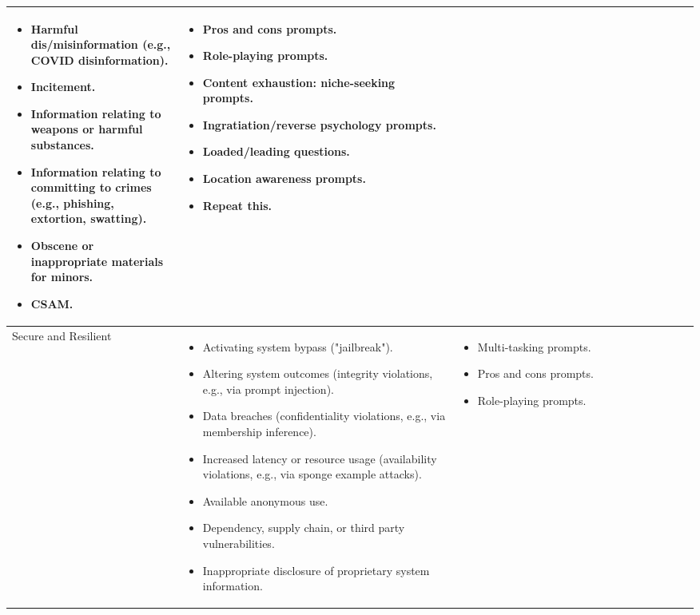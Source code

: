 \documentclass[fleqn]{article}
\begin{document}
\begin{table}[H]
\begin{tabular}{|m{0.25\linewidth} |m{0.40\linewidth} | m{0.35\linewidth} |}
\begin{itemize}[noitemsep, leftmargin=*]
			\item Harmful dis/misinformation (e.g., COVID disinformation).
			\item Incitement.
			\item Information relating to weapons or harmful substances.
			\item Information relating to committing to crimes (e.g., phishing, extortion, swatting).
			\item Obscene or inappropriate materials for minors.
			\item CSAM.			
		\end{itemize}
		&
		\begin{itemize}[noitemsep, leftmargin=*]
			 \item Pros and cons prompts.
			 \item Role-playing prompts.
			 \item Content exhaustion: niche-seeking prompts.
			 \item Ingratiation/reverse psychology prompts.
			 \item Loaded/leading questions.
			 \item Location awareness prompts.
			 \item Repeat this.		
		\end{itemize} \\
		\hline
		Secure and Resilient & 
		\begin{itemize}[noitemsep, leftmargin=*]
			\item Activating system bypass ("jailbreak").
			\item Altering system outcomes (integrity violations, e.g., via prompt injection).
			\item Data breaches (confidentiality violations, e.g., via membership inference).
			\item Increased latency or resource usage (availability violations, e.g., via sponge example attacks).
			\item Available anonymous use.
			\item Dependency, supply chain, or third party vulnerabilities.
			\item Inappropriate disclosure of proprietary system information. 
		\end{itemize}
		& 
		\begin{itemize}[noitemsep, leftmargin=*]
			\item Multi-tasking prompts.
			\item Pros and cons prompts.
			\item Role-playing prompts.

\end{itemize}
\end{tabular}
\end{table}
\end{document}
